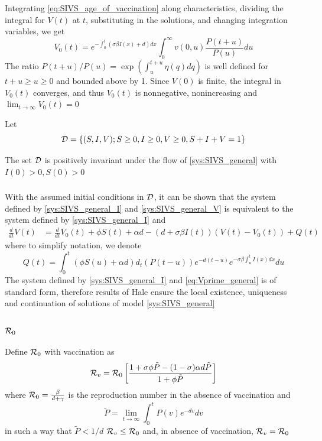 \documentclass[aspectratio=169]{beamer}\usepackage[]{graphicx}\usepackage[]{xcolor}
\begin{document}
\begin{frame}
Integrating \eqref{eq:SIVS_age_of_vaccination} along characteristics, dividing the integral for $V(t)$ at $t$, substituting in the solutions, and changing integration variables, we get
\begin{equation}
V_0(t)=e^{-\int_0^t(\sigma\beta I(x)+d)dx} \int_0^\infty
v(0,u)\frac{P(t+u)}{P(u)}du 
\label{eq:V0}
\end{equation}
The ratio $P(t+u)/P(u)=\exp\left(\int_u^{t+u}\eta(q)dq\right)$ is well defined for $t+u\geq u\geq 0$ and bounded above by 1. 
\vfill
Since $V(0)$ is finite, the integral in $V_0(t)$ converges, and thus $V_0(t)$ is nonnegative,
nonincreasing and $\lim_{t\to\infty}V_0(t)=0$
\end{frame}

\begin{frame}
Let
\[
\mathcal{D}=\{
(S,I,V); S\geq 0, I\geq 0, V\geq 0, S+I+V=1
\}
\]
\vfill
\begin{theorem}
The set $\mathcal{D}$ is positively invariant under the flow of \eqref{sys:SIVS_general} with $I(0)>0, S(0)>0$
\label{th:invariance_gen_model}
\end{theorem}
\end{frame}


\begin{frame}\frametitle{}
With the assumed initial conditions in $\mathcal{D}$, it can be shown that the system defined by \eqref{sys:SIVS_general_I} and \eqref{sys:SIVS_general_V} is equivalent to the system defined by \eqref{sys:SIVS_general_I} and
\begin{align}
\label{eq:Vprime_general}
\frac{d}{dt}V(t) &= \frac{d}{dt}V_0(t)+\phi S(t)+\alpha d -(d+\sigma\beta I(t))(V(t)-V_0(t)) 
+ Q(t)
\end{align}
where to simplify notation, we denote
\[
Q(t)=\int_0^t (\phi S(u)+\alpha d) d_t(P(t-u))e^{-d(t-u)}
e^{-\sigma\beta\int_u^t I(x)dx}du
\]
\vfill
The system defined by \eqref{sys:SIVS_general_I} and \eqref{eq:Vprime_general} is of standard form, therefore results of Hale \cite{hale2013introduction} ensure the local existence, uniqueness and continuation of solutions of model \eqref{sys:SIVS_general}
\end{frame}

\begin{frame}\frametitle{$\mathcal{R}_0$}
Define $\mathcal{R}_0$ with vaccination as
\begin{equation}
\mathcal{R}_v=\mathcal{R}_0\left[
\frac{1+\sigma\phi\tilde P-(1-\sigma)\alpha d\tilde P}
{1+\phi\tilde P}
\right]
\label{eq:generalRphi}
\end{equation}
where $\mathcal{R}_0=\frac{\beta}{d+\gamma}$ is the reproduction number in the absence of vaccination and 
\[
\tilde P=\lim_{t\to\infty}\int_0^t P(v)e^{-dv}dv
\]
in such a way that $\tilde P<1/d$
\vfill
\bbullet
$\mathcal{R}_v\leq \mathcal{R}_0$ and, in absence of vaccination,
$\mathcal{R}_v=\mathcal{R}_0$
\end{frame}
\end{document}
